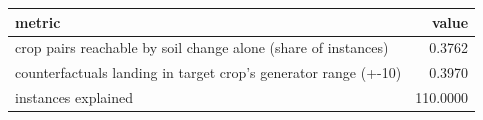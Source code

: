 \begin{tabular}{lr}
\toprule
metric & value \\
\midrule
crop pairs reachable by soil change alone (share of instances) & 0.3762 \\
counterfactuals landing in target crop's generator range (+-10) & 0.3970 \\
instances explained & 110.0000 \\
\bottomrule
\end{tabular}
